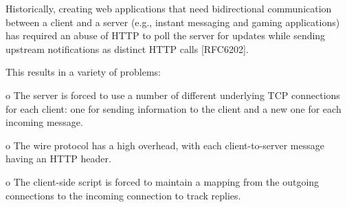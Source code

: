  Historically, creating web applications that need bidirectional
   communication between a client and a server (e.g., instant messaging
   and gaming applications) has required an abuse of HTTP to poll the
   server for updates while sending upstream notifications as distinct
   HTTP calls [RFC6202].

   This results in a variety of problems:

   o  The server is forced to use a number of different underlying TCP
      connections for each client: one for sending information to the
      client and a new one for each incoming message.

   o  The wire protocol has a high overhead, with each client-to-server
      message having an HTTP header.

   o  The client-side script is forced to maintain a mapping from the
      outgoing connections to the incoming connection to track replies.
